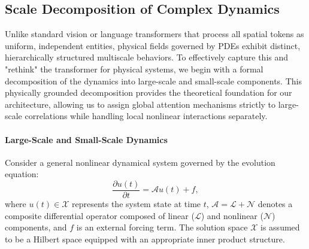 \documentclass[final,3p,times]{elsarticle}
\begin{document}



\subsection{Scale Decomposition of Complex Dynamics}\label{sec:scale_decomposition}
Unlike standard vision or language transformers that process all spatial tokens as uniform, independent entities, physical fields governed by PDEs exhibit distinct, hierarchically structured multiscale behaviors. To effectively capture this and "rethink" the transformer for physical systems, we begin with a formal decomposition of the dynamics into large-scale and small-scale components. This physically grounded decomposition provides the theoretical foundation for our architecture, allowing us to assign global attention mechanisms strictly to large-scale correlations while handling local nonlinear interactions separately.

\paragraph{Large-Scale and Small-Scale Dynamics}
Consider a general nonlinear dynamical system governed by the evolution equation:
\begin{equation}
\frac{\partial u(t)}{\partial t} = \mathscr{A}u(t) + f,
\label{eq:general_dynamics}
\end{equation}
where $u(t) \in \mathscr{X}$ represents the system state at time $t$, $\mathscr{A} = \mathscr{L} + \mathscr{N}$ denotes a composite differential operator composed of linear ($\mathscr{L}$) and nonlinear ($\mathscr{N}$) components, and $f$ is an external forcing term. The solution space $\mathscr{X}$ is assumed to be a Hilbert space equipped with an appropriate inner product structure.
\end{document}

